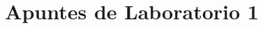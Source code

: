 \documentclass[a4paper]{report}
\begin{document}
\title{Apuntes de Laboratorio 1}
\maketitle

\tableofcontents

\end{document}
